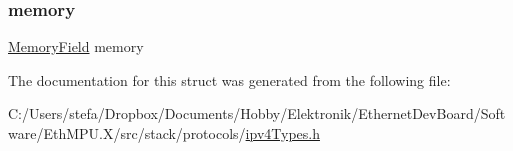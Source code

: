 \mbox{\label{structipv4_packet___a7dd6a3160ed58904a4699e281fc4617b}} 
\subsubsection{\texorpdfstring{memory}{memory}}
{\footnotesize\ttfamily \mbox{\hyperlink{group__memory_gae2c54b1b1aca949825bf68fe618c8e97}{Memory\+Field}} memory}



The documentation for this struct was generated from the following file\+:\begin{DoxyCompactItemize}
\item 
C\+:/\+Users/stefa/\+Dropbox/\+Documents/\+Hobby/\+Elektronik/\+Ethernet\+Dev\+Board/\+Software/\+Eth\+M\+P\+U.\+X/src/stack/protocols/\mbox{\hyperlink{ipv4_types_8h}{ipv4\+Types.\+h}}\end{DoxyCompactItemize}
